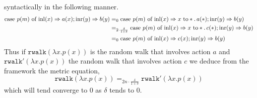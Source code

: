 \documentclass[a4paper,UKenglish,cleveref, autoref, thm-restate]{lipics-v2021}
\begin{document}
\begin{example}
        syntactically in the following manner.
        \begin{align*}
               \text{case } p(m) \text{ of } \mathrm{inl}(x) \Rightarrow a(x) ; 
               \mathrm{inr}(y) \Rightarrow b(y)
               & =_0
               \text{case } p(m) \text{ of } \mathrm{inl}(x) \Rightarrow x \text{ to} 
               \ast. \, a(\ast) 
               ; 
               \mathrm{inr}(y) \Rightarrow b(y)
               \\
               & =_{2 \cdot {\frac{\delta}{1 + \delta}}}
               \text{case } p(m) \text{ of } \mathrm{inl}(x) \Rightarrow x \text{ to} 
               \ast. \, c(\ast) 
               ; 
               \mathrm{inr}(y) \Rightarrow b(y)
               \\
               & =_0
               \text{case } p(m) \text{ of } \mathrm{inl}(x) \Rightarrow c(x) 
               ; 
               \mathrm{inr}(y) \Rightarrow b(y)
        \end{align*}
        Thus if $\mathtt{rwalk}(\lambda x. p(x))$ is the random walk that
        involves action $a$ and $\mathtt{rwalk'}(\lambda x. p(x))$ the random
        walk that involves action $c$ we deduce from the framework the metric
        equation,
        \[
                \mathtt{rwalk}(\lambda x. p(x)) =_{2n \cdot \frac{\delta}{1 + \delta}}
                \mathtt{rwalk'}(\lambda x. p(x)) 
        \]
        which will tend converge to $0$ as $\delta$ tends to $0$.
\end{example}
\end{document}
